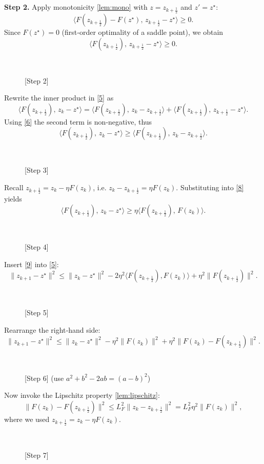 \documentclass{article}
\begin{document}
\bigskip
\noindent\textbf{Step 2.}  Apply monotonicity \eqref{lem:mono} with $z=z_{k+\frac12}$ and $z'=z^{\star}$:
\[
\langle F(z_{k+\frac12})-F(z^{\star}),\,z_{k+\frac12}-z^{\star}\rangle\ge0.
\]
Since $F(z^{\star})=0$ (first‑order optimality of a saddle point), we obtain
\[
\langle F(z_{k+\frac12}),\,z_{k+\frac12}-z^{\star}\rangle\ge0.
\tag{6}
\]
\begin{description}
\item[\,] \hfill[Step 2]
\end{description}
Rewrite the inner product in \eqref{5} as
\[
\langle F(z_{k+\frac12}),\,z_{k}-z^{\star}\rangle
= \langle F(z_{k+\frac12}),\,z_{k}-z_{k+\frac12}\rangle
  +\langle F(z_{k+\frac12}),\,z_{k+\frac12}-z^{\star}\rangle .
\tag{7}
\]
Using \eqref{6} the second term is non‑negative, thus
\[
\langle F(z_{k+\frac12}),\,z_{k}-z^{\star}\rangle
\ge \langle F(z_{k+\frac12}),\,z_{k}-z_{k+\frac12}\rangle .
\tag{8}
\]
\begin{description}
\item[\,] \hfill[Step 3]
\end{description}
Recall $z_{k+\frac12}=z_{k}-\eta F(z_{k})$, i.e. $z_{k}-z_{k+\frac12}= \eta F(z_{k})$.  Substituting into \eqref{8} yields
\[
\langle F(z_{k+\frac12}),\,z_{k}-z^{\star}\rangle
\ge \eta\langle F(z_{k+\frac12}),\,F(z_{k})\rangle .
\tag{9}
\]
\begin{description}
\item[\,] \hfill[Step 4]
\end{description}
Insert \eqref{9} into \eqref{5}:
\[
\|z_{k+1}-z^{\star}\|^{2}
\le \|z_{k}-z^{\star}\|^{2}
   -2\eta^{2}\langle F(z_{k+\frac12}),F(z_{k})\rangle
   +\eta^{2}\|F(z_{k+\frac12})\|^{2}.
\tag{10}
\]
\begin{description}
\item[\,] \hfill[Step 5]
\end{description}
Rearrange the right‑hand side:
\[
\|z_{k+1}-z^{\star}\|^{2}
\le \|z_{k}-z^{\star}\|^{2}
   -\eta^{2}\|F(z_{k})\|^{2}
   +\eta^{2}\|F(z_{k})-F(z_{k+\frac12})\|^{2}.
\tag{11}
\]
\begin{description}
\item[\,] \hfill[Step 6] (use $a^{2}+b^{2}-2ab=(a-b)^{2}$)
\end{description}
Now invoke the Lipschitz property \eqref{lem:lipschitz}:
\[
\|F(z_{k})-F(z_{k+\frac12})\|^{2}
\le L_{F}^{2}\|z_{k}-z_{k+\frac12}\|^{2}
= L_{F}^{2}\eta^{2}\|F(z_{k})\|^{2},
\tag{12}
\]
where we used $z_{k+\frac12}=z_{k}-\eta F(z_{k})$.
\begin{description}
\item[\,] \hfill[Step 7]
\end{description}
\end{document}
